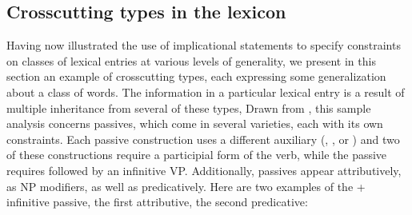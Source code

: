 \documentclass[output=paper]{langsci/langscibook}
\begin{document}


\subsection{Crosscutting types in the lexicon}
Having now illustrated the use of implicational statements to specify constraints on classes of lexical entries at various levels of generality, we present in this section an example of crosscutting types, each expressing some generalization about a class of words.
The information in a particular lexical entry is a result of multiple inheritance from several of these types, 
Drawn from , this sample analysis concerns  passives,  which come in several varieties, each with its own constraints.
Each passive construction uses a different auxiliary (, , or ) and two of these constructions require a participial form of the verb, while the  passive requires  followed by an infinitive VP.
Additionally, passives appear attributively, as NP modifiers, as well as predicatively.
Here are two examples of the  + infinitive passive, the first attributive, the second predicative:
\end{document}
